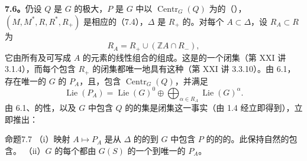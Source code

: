 \textbf{7.6。}仍设 $Q$ 是 $G$ 的极大，$P$ 是 $G$ 中以 $\operatorname{Centr}_G(Q)$ 为的（），$(M,M^*,R,R^*,R_+)$ 是相应的（7.4），$\Delta$ 是 $R_+$ 的。对每个 $A\subset\Delta$，设 $R_A\subset R$ 为
\[
 R_A=R_+\cup(\mathbb ZA\cap R_-),
\]
它由所有及可写成 $A$ 的元素的线性组合的组成。这是的一个闭集（第 XXI 讲 3.1.4），而每个包含 $R_+$ 的闭集都唯一地具有这种（第 XXI 讲 3.3.10）。由 6.1，存在唯一的 $G$ 的 $P_A$，且，包含 $\operatorname{Centr}_G(Q)$，并满足
\[
 \operatorname{Lie}(P_A)=\operatorname{Lie}(G)^0\oplus\bigoplus_{\alpha\in R_A}\operatorname{Lie}(G)^\alpha.
\]
由 6.1、的性，以及 $G$ 中包含 $Q$ 的的集是闭集这一事实（由 1.4 经立即得到），立即推出：
\begin{SGAresult}{命题}{7.7}
（i）映射 $A\mapsto P_A$ 是从 $\Delta$ 的的到 $G$ 中包含 $P$ 的的的。此保持自然的包含。
（ii）$G$ 的每个都由 $G(S)$ 的一个到唯一的 $P_A$。
\end{SGAresult}

